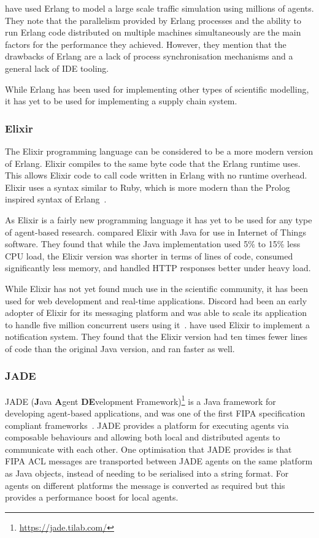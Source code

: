  have used Erlang to model a large scale traffic simulation using millions of agents.
They note that the parallelism provided by Erlang processes and the ability to run Erlang code distributed on multiple machines simultaneously are the main factors for the performance they achieved.
However, they mention that the drawbacks of Erlang are a lack of process synchronisation mechanisms and a general lack of IDE tooling.

While Erlang has been used for implementing other types of scientific modelling, it has yet to be used for implementing a supply chain system.

\subsubsection{Elixir}

The Elixir programming language can be considered to be a more modern version of Erlang.
Elixir compiles to the same byte code that the Erlang runtime uses.
This allows Elixir code to call code written in Erlang with no runtime overhead.
Elixir uses a syntax similar to Ruby, which is more modern than the Prolog inspired syntax of Erlang~\cite{loder2016erlang}.

As Elixir is a fairly new programming language it has yet to be used for any type of agent-based research.
 compared Elixir with Java for use in Internet of Things software.
They found that while the Java implementation used 5\% to 15\% less CPU load, the Elixir version was shorter in terms of lines of code, consumed significantly less memory, and handled HTTP responses better under heavy load.

While Elixir has not yet found much use in the scientific community, it has been used for web development and real-time applications.
Discord had been an early adopter of Elixir for its messaging platform and was able to scale its application to handle five million concurrent users using it~\cite{vishnevskiy2017discord}.
 have used Elixir to implement a notification system.
They found that the Elixir version had ten times fewer lines of code than the original Java version, and ran faster as well.

\subsubsection{JADE}

JADE (\textbf{J}ava \textbf{A}gent \textbf{DE}velopment Framework)\footnote{\url{https://jade.tilab.com/}} is a Java framework for developing agent-based applications, and was one of the first FIPA specification compliant frameworks~\cite{bellifemine1999jade}.
JADE provides a platform for executing agents via composable behaviours and allowing both local and distributed agents to communicate with each other.
One optimisation that JADE provides is that FIPA ACL messages are transported between JADE agents on the same platform as Java objects, instead of needing to be serialised into a string format.
For agents on different platforms the message is converted as required but this provides a performance boost for local agents.

